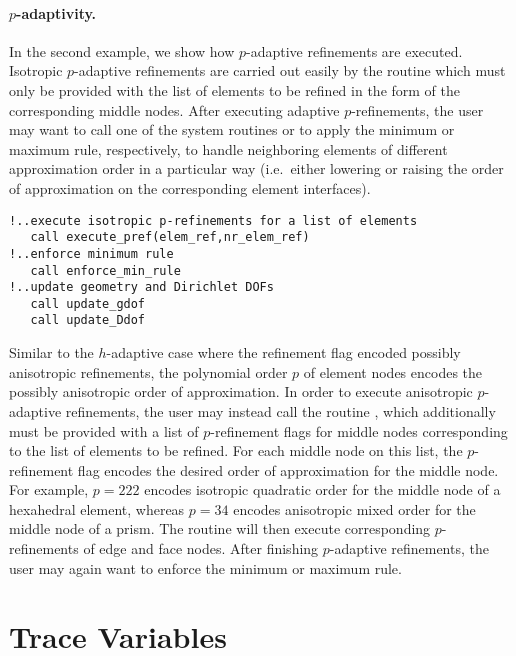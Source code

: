 \paragraph{$p$-adaptivity.}
In the second example, we show how $p$-adaptive refinements are executed. Isotropic $p$-adaptive refinements are carried out easily by the routine  which must only be provided with the list of elements to be refined in the form of the corresponding middle nodes. After executing adaptive $p$-refinements, the user may want to call one of the system routines  or  to apply the minimum or maximum rule, respectively, to handle neighboring elements of different approximation order in a particular way (i.e.~either lowering or raising the order of approximation on the corresponding element interfaces).

\begin{lstlisting}[caption=Isotropic $p$-adaptive refinements., label={lst:adaptive_refinement_element_loop4}]
!..execute isotropic p-refinements for a list of elements
   call execute_pref(elem_ref,nr_elem_ref)
!..enforce minimum rule
   call enforce_min_rule
!..update geometry and Dirichlet DOFs
   call update_gdof
   call update_Ddof
\end{lstlisting}

Similar to the $h$-adaptive case where the refinement flag encoded possibly anisotropic refinements, the polynomial order $p$ of element nodes encodes the possibly anisotropic order of approximation. In order to execute anisotropic $p$-adaptive refinements, the user may instead call the routine , which additionally must be provided with a list of $p$-refinement flags for middle nodes corresponding to the list of elements to be refined. For each middle node on this list, the $p$-refinement flag encodes the desired order of approximation for the middle node. For example, $p=222$ encodes isotropic quadratic order for the middle node of a hexahedral element, whereas $p=34$ encodes anisotropic mixed order for the middle node of a prism. The routine will then execute corresponding $p$-refinements of edge and face nodes. After finishing $p$-adaptive refinements, the user may again want to enforce the minimum or maximum rule.

\section{Trace Variables}
\label{sec:traces}

